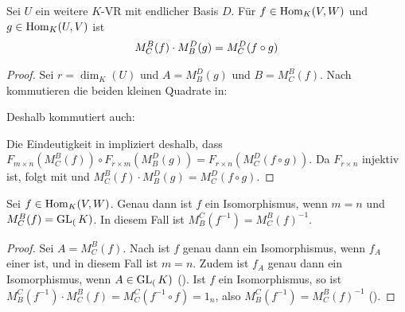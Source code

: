 \begin{lemma}
	Sei $U$ ein weitere $K$-VR mit endlicher Basis $D$. Für $f\in \operatorname{Hom}_K(V,W)$ und $g\in \operatorname{Hom}_K(U,V)$ ist 
	\begin{align}
		M_C^B(f)\cdot M_B^D(g)=M_C^D(f\circ g)\notag
	\end{align}
\end{lemma}
\begin{proof}
	Sei $r=\dim_K(U)$ und $A=M_B^D(g)$ und $B=M_C^B(f)$. Nach  kommutieren die beiden kleinen Quadrate in: 
	\begin{center}\end{center}
	Deshalb kommutiert auch:
	\begin{center}\end{center}
	Die Eindeutigkeit in  impliziert deshalb, dass $F_{m\times n}(M_C^B(f))\circ F_{r\times m}(M_B^D(g))=F_{r\times n}
	(M_C^D(f\circ g))$. Da $F_{r\times n}$ injektiv ist, folgt mit  und  $M_C^B(f)\cdot M_B^D(g)=M_C^D(f\circ g)$.
\end{proof}

\begin{conclusion}
	Sei $f\in \operatorname{Hom}_K(V,W)$. Genau dann ist $f$ ein Isomorphismus, wenn $m=n$ und $M_C^B(f)=\operatorname{GL}_(K)$. In 
	diesem Fall ist $M_B^C(f^{-1})=M_C^B(f)^{-1}$.
\end{conclusion}
\begin{proof}
	Sei $A=M_C^B(f)$. Nach  ist $f$ genau dann ein Isomorphismus, wenn $f_A$ einer ist, und in diesem Fall ist $m=n$. Zudem ist 
	$f_A$ genau dann ein Isomorphismus, wenn $A\in \operatorname{GL}_(K)$ (). Ist $f$ ein Isomorphismus, so ist $M_B^C(f^{-1})\cdot 
	M_C^B(f)=M_C^C(f^{-1}\circ f)=1_n$, also $M_B^C(f^{-1})=M_C^B(f)^{-1}$ ().
\end{proof}

